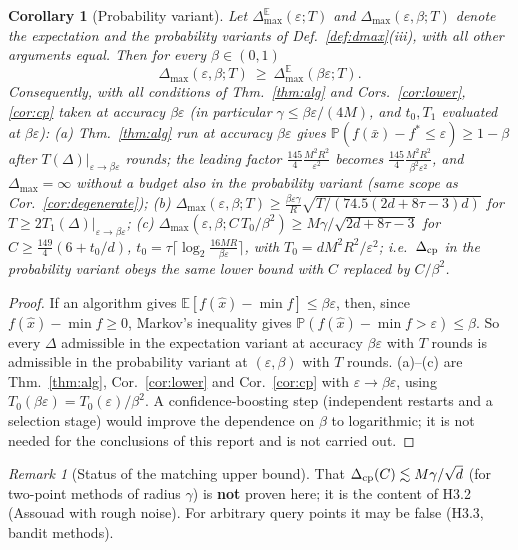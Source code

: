 \documentclass[11pt,a4paper]{article}
\numberwithin{equation}{section}
\newtheorem{corollary}[theorem]{Corollary}
\theoremstyle{definition}
\theoremstyle{remark}
\newtheorem{remark}[theorem]{Remark}
\newcommand{\E}{\mathbb E}\newcommand{\R}{\mathbb R}\newcommand{\N}{\mathbb N}\newcommand{\Prob}{\mathbb P}
\newcommand{\Dmax}{\Delta_{\max}}\newcommand{\Dcp}{\Delta_{\rm cp}}
\begin{document}
\begin{corollary}[Probability variant]\label{cor:prob}
Let $\Dmax^{\E}(\varepsilon;T)$ and $\Dmax(\varepsilon,\beta;T)$ denote the expectation and the probability variants of Def.~\ref{def:dmax}(iii), with all other arguments equal. Then for every $\beta\in(0,1)$
\[\Dmax(\varepsilon,\beta;T)\ \ge\ \Dmax^{\E}(\beta\varepsilon;T).\]
Consequently, with all conditions of Thm.~\ref{thm:alg} and Cors.~\ref{cor:lower}, \ref{cor:cp} taken at accuracy $\beta\varepsilon$ (in particular $\gamma\le\beta\varepsilon/(4M)$, and $t_0,T_1$ evaluated at $\beta\varepsilon$):
(a) Thm.~\ref{thm:alg} run at accuracy $\beta\varepsilon$ gives $\Prob(f(\bar x)-f^*\le\varepsilon)\ge1-\beta$ after $T(\Delta)|_{\varepsilon\to\beta\varepsilon}$ rounds; the leading factor $\frac{145}4\frac{M^2R^2}{\varepsilon^2}$ becomes $\frac{145}4\frac{M^2R^2}{\beta^2\varepsilon^2}$, and $\Dmax=\infty$ without a budget also in the probability variant (same scope as Cor.~\ref{cor:degenerate});
(b) $\Dmax(\varepsilon,\beta;T)\ge\frac{\beta\varepsilon\gamma}R\sqrt{T/(74.5(2d+8\tau-3)d)}$ for $T\ge2T_1(\Delta)|_{\varepsilon\to\beta\varepsilon}$;
(c) $\Dmax(\varepsilon,\beta;C\,T_0/\beta^2)\ge M\gamma/\sqrt{2d+8\tau-3}$ for $C\ge\frac{149}4(6+t_0/d)$, $t_0=\tau\lceil\log_2\frac{16MR}{\beta\varepsilon}\rceil$, with $T_0=dM^2R^2/\varepsilon^2$; i.e.\ $\Dcp$ in the probability variant obeys the same lower bound with $C$ replaced by $C/\beta^2$.
\end{corollary}
\begin{proof}
If an algorithm gives $\E[f(\hat x)-\min f]\le\beta\varepsilon$, then, since $f(\hat x)-\min f\ge0$, Markov's inequality gives $\Prob(f(\hat x)-\min f>\varepsilon)\le\beta$. So every $\Delta$ admissible in the expectation variant at accuracy $\beta\varepsilon$ with $T$ rounds is admissible in the probability variant at $(\varepsilon,\beta)$ with $T$ rounds. (a)--(c) are Thm.~\ref{thm:alg}, Cor.~\ref{cor:lower} and Cor.~\ref{cor:cp} with $\varepsilon\to\beta\varepsilon$, using $T_0(\beta\varepsilon)=T_0(\varepsilon)/\beta^2$. A confidence-boosting step (independent restarts and a selection stage) would improve the dependence on $\beta$ to logarithmic; it is not needed for the conclusions of this report and is not carried out.
\end{proof}

\begin{remark}[Status of the matching upper bound]
That $\Dcp(C)\lesssim M\gamma/\sqrt d$ (for two-point methods of radius $\gamma$) is \textbf{not} proven here; it is the content of H3.2 (Assouad with rough noise). For arbitrary query points it may be false (H3.3, bandit methods).
\end{remark}
\end{document}
